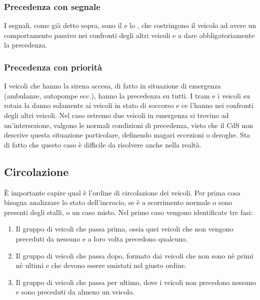 \subsubsection{Precedenza con segnale}
I segnali, come già detto sopra, sono il  e lo , che costringono il veicolo ad avere un comportamento passivo nei confronti degli altri veicoli e a dare obbligatoriamente la precedenza.

\subsubsection{Precedenza con priorità}
I veicoli che hanno la sirena accesa, di fatto in situazione di emergenza (ambulanze, autopompe ecc.), hanno la precedenza su tutti. I tram e i veicoli su rotaia la danno solamente ai veicoli in stato di soccorso e ce l'hanno nei confronti degli altri veicoli. Nel caso estremo due veicoli in emergenza si trovino ad un'intersezione, valgono le normali condizioni di precedenza, visto che il CdS non descrive questa situazione particolare, definendo magari eccezioni o deroghe. Sta di fatto che questo caso è difficile da risolvere anche nella realtà.

\subsection{Circolazione}
\label{ssec:circ}
È importante capire qual è l'ordine di circolazione dei veicoli. Per prima cosa bisogna analizzare lo stato dell'incrocio, se è a scorrimento normale o sono presenti degli stalli, o un caso misto. Nel primo caso vengono identificate tre fasi:
\begin{enumerate}
	\item Il gruppo di veicoli che passa prima, ossia quei veicoli che non vengono preceduti da nessuno e a loro volta precedono qualcuno.
	\item Il gruppo di veicoli che passa dopo, formato dai veicoli che non sono nè primi nè ultimi e che devono essere smistati nel giusto ordine.
	\item Il gruppo di veicoli che passa per ultimo, dove i veicoli non precedono nessuno e sono preceduti da almeno un veicolo.
\end{enumerate}

